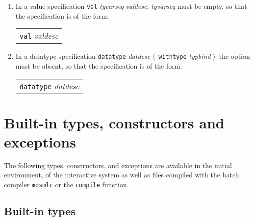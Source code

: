 \documentclass[fleqn]{article}
\newcommand{\la}{$\langle$}
\newcommand{\ra}{$\rangle$}
\begin{document}
\begin{itemize}
\begin{enumerate}
  \item\label{valspec} 
  In a value specification {\tt val} {\it tyvarseq\/} {\it valdesc\/},
  {\it tyvarseq\/} must be empty, so that the specification is of the form:

  \begin{tabular}{l}
   {\tt val} {\it valdesc\/}
  \end{tabular}

  \item\label{datatypespec} 
  In a datatype specification 
  {\tt datatype}  {\it datdesc} \la\ {\tt withtype} {\it typbind\/} \ra\
  the option must be absent, so that the specification is of the form:

  \begin{tabular}{l}
  {\tt datatype}  {\it datdesc}
  \end{tabular}
\end{enumerate}
\end{itemize}

\newpage

\section{Built-in types, constructors and exceptions}
\label{sec-builtin}

The following types, constructors, and exceptions are available in the
initial environment, of the interactive system as well as files
compiled with the batch compiler {\tt mosmlc} or the {\tt compile}
function.


\subsection*{Built-in types}
\end{document}
